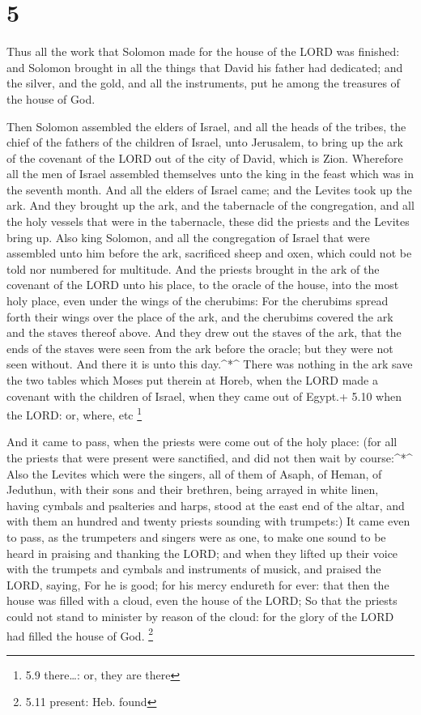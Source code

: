 \hypertarget{section-4}{%
\section{5}\label{section-4}}

 Thus all the work that Solomon made for the house of the
LORD was finished: and Solomon brought in all the things that David his
father had dedicated; and the silver, and the gold, and all the
instruments, put he among the treasures of the house of God.

 Then Solomon assembled the elders of Israel, and all the
heads of the tribes, the chief of the fathers of the children of Israel,
unto Jerusalem, to bring up the ark of the covenant of the LORD out of
the city of David, which is Zion.  Wherefore all the men of
Israel assembled themselves unto the king in the feast which was in the
seventh month.  And all the elders of Israel came; and the
Levites took up the ark.  And they brought up the ark, and
the tabernacle of the congregation, and all the holy vessels that were
in the tabernacle, these did the priests and the Levites bring up.
 Also king Solomon, and all the congregation of Israel that
were assembled unto him before the ark, sacrificed sheep and oxen, which
could not be told nor numbered for multitude.  And the
priests brought in the ark of the covenant of the LORD unto his place,
to the oracle of the house, into the most holy place, even under the
wings of the cherubims:  For the cherubims spread forth
their wings over the place of the ark, and the cherubims covered the ark
and the staves thereof above.  And they drew out the staves
of the ark, that the ends of the staves were seen from the ark before
the oracle; but they were not seen without. And there it is unto this
day.\^{}*\^{}  There was nothing in the ark save the two
tables which Moses put therein at Horeb, when the LORD made a covenant
with the children of Israel, when they came out of Egypt.+ 5.10 when the
LORD: or, where, etc \footnote{5.9 there\ldots: or, they are there}

 And it came to pass, when the priests were come out of the
holy place: (for all the priests that were present were sanctified, and
did not then wait by course:\^{}*\^{}  Also the Levites
which were the singers, all of them of Asaph, of Heman, of Jeduthun,
with their sons and their brethren, being arrayed in white linen, having
cymbals and psalteries and harps, stood at the east end of the altar,
and with them an hundred and twenty priests sounding with trumpets:)
 It came even to pass, as the trumpeters and singers were
as one, to make one sound to be heard in praising and thanking the LORD;
and when they lifted up their voice with the trumpets and cymbals and
instruments of musick, and praised the LORD, saying, For he is good; for
his mercy endureth for ever: that then the house was filled with a
cloud, even the house of the LORD;  So that the priests
could not stand to minister by reason of the cloud: for the glory of the
LORD had filled the house of God. \footnote{5.11 present: Heb. found}

